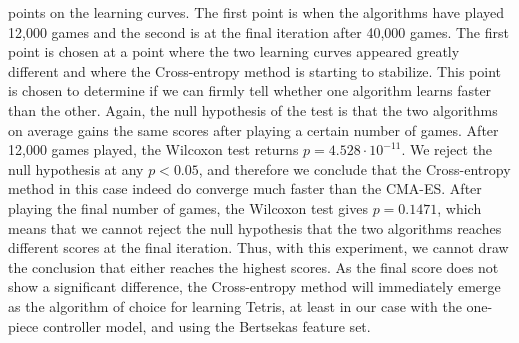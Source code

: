 points on the learning curves. The first point is when the algorithms have played 12,000 
games and the second is at the final iteration after 40,000 games. The first point is chosen at a point 
where the two learning curves appeared greatly different and where the Cross-entropy method
is starting to stabilize. This point is chosen to determine if we can firmly tell
whether one algorithm learns faster than the other. Again, the null hypothesis of the
test is that the two algorithms on average gains the same scores after playing 
a certain number of games.
After 12,000 games played, the Wilcoxon test returns $p=4.528 \cdot 10^{-11}$. We reject the
null hypothesis at any $p < 0.05$, and therefore we conclude that the Cross-entropy method
in this case indeed do converge much faster than the CMA-ES. After playing the final number of games,
the Wilcoxon test gives $p=0.1471$, which means that we cannot reject the null hypothesis 
that the two algorithms reaches different scores at the final iteration. 
Thus, with this experiment, 
we cannot draw the conclusion that either reaches the highest scores. 
As the final score does not show a significant difference, the Cross-entropy method will 
immediately emerge as the algorithm of choice for learning Tetris, at least in our case
with the one-piece controller model, and using the Bertsekas feature set.







